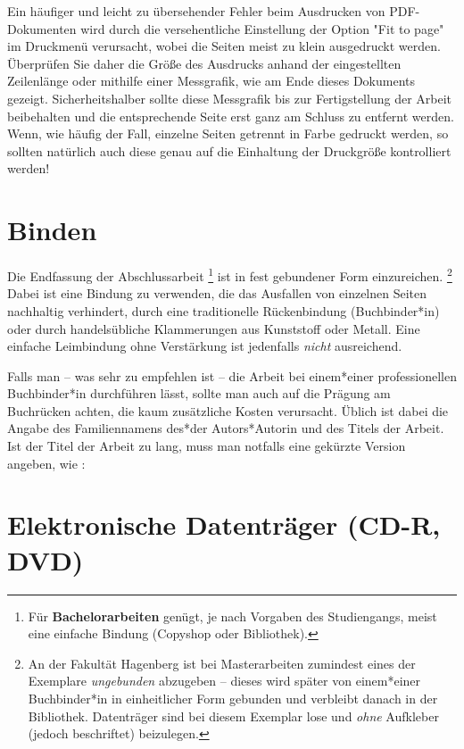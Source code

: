 Ein häufiger und leicht zu übersehender Fehler beim Ausdrucken von
PDF-Doku\-menten wird durch die versehentliche Einstellung der
Option "Fit to page" im Druckmenü verursacht, wobei die Seiten
meist zu klein ausgedruckt werden. Überprüfen Sie daher die Größe
des Ausdrucks anhand der eingestellten Zeilenlänge oder mithilfe
einer Messgrafik, wie am Ende dieses Dokuments gezeigt.
Sicherheitshalber sollte diese Messgrafik bis zur
Fertigstellung der Arbeit beibehalten und die entsprechende
Seite erst ganz am Schluss zu entfernt werden.
Wenn, wie häufig der Fall, einzelne Seiten getrennt in Farbe gedruckt 
werden, so sollten natürlich auch diese genau auf die Einhaltung der Druckgröße 
kontrolliert werden!


\section{Binden}

Die Endfassung der Abschlussarbeit%
\footnote{Für \textbf{Bachelorarbeiten} genügt, je nach Vorgaben des Studiengangs,
	meist eine einfache Bindung (Copyshop oder Bibliothek).}
ist in fest gebundener Form einzureichen.%
\footnote{An der Fakultät Hagenberg ist bei Masterarbeiten zumindest eines der
Exemplare \emph{ungebunden} abzugeben -- dieses wird später von einem*einer
Buchbinder*in in einheitlicher Form gebunden und verbleibt
danach in der Bibliothek. Datenträger sind bei diesem Exemplar lose 
und \emph{ohne} Aufkleber (jedoch beschriftet) beizulegen.}
Dabei ist eine Bindung zu
verwenden, die das Ausfallen von einzelnen Seiten nachhaltig
verhindert, \zB durch eine traditionelle Rückenbindung
(Buchbinder*in) oder durch handelsübliche Klammerungen aus Kunststoff
oder Metall. Eine einfache Leimbindung ohne Verstärkung ist
jedenfalls \emph{nicht} ausreichend.

Falls man -- was sehr zu empfehlen ist -- die Arbeit bei einem*einer
professionellen Buchbinder*in durchführen lässt, sollte man auch auf
die Prägung am Buchrücken achten, die kaum zusätzliche Kosten
verursacht. Üblich ist dabei die Angabe des Familiennamens des*der
Autors*Autorin und des Titels der Arbeit. Ist der Titel der Arbeit zu
lang, muss man notfalls eine gekürzte Version angeben, wie \zB:
%
\begin{center}
\setlength{\fboxsep}{3mm}
\end{center}
%


\section{Elektronische Datenträger (CD-R, DVD)}

